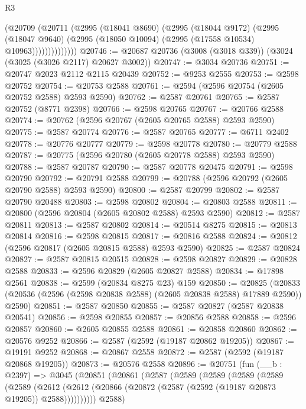 \begin{lexlean}{R3}
\begin{coremodule}
                  (@20709
                    (@20711
                      (@2995
                        (@18041 @8690)
                        (@2995
                          (@18044 @9172)
                          (@2995
                            (@18047 @9640)
                            (@2995 (@18050 @10094) (@2995 (@17558 @10534) @10963))))))))))))))
@20746 := @20687 @20736 (@3008 (@3018 @339)) (@3024 (@3025 (@3026 @2117) @20627 @3002))
@20747 := @3034 @20736
@20751 := @20747 @2023 @2112 @2115 @20439
@20752 := @9253 @2555
@20753 := @2598 @20752
@20754 := @20753 @2588
@20761 := @2594 (@2596 @20754 (@2605 @20752 @2588) @2593 @2590)
@20762 := @2587 @20761
@20765 := @2587 @20752 (@8771 @2398)
@20766 := @2598 @20765
@20767 := @20766 @2588
@20774 := @20762 (@2596 @20767 (@2605 @20765 @2588) @2593 @2590)
@20775 := @2587 @20774
@20776 := @2587 @20765
@20777 := @6711 @2402
@20778 := @20776 @20777
@20779 := @2598 @20778
@20780 := @20779 @2588
@20787 := @20775 (@2596 @20780 (@2605 @20778 @2588) @2593 @2590)
@20788 := @2587 @20787
@20790 := @2587 @20778 @20475
@20791 := @2598 @20790
@20792 := @20791 @2588
@20799 := @20788 (@2596 @20792 (@2605 @20790 @2588) @2593 @2590)
@20800 := @2587 @20799
@20802 := @2587 @20790 @20488
@20803 := @2598 @20802
@20804 := @20803 @2588
@20811 := @20800 (@2596 @20804 (@2605 @20802 @2588) @2593 @2590)
@20812 := @2587 @20811
@20813 := @2587 @20802
@20814 := @20514 @8275
@20815 := @20813 @20814
@20816 := @2598 @20815
@20817 := @20816 @2588
@20824 := @20812 (@2596 @20817 (@2605 @20815 @2588) @2593 @2590)
@20825 := @2587 @20824
@20827 := @2587 @20815 @20515
@20828 := @2598 @20827
@20829 := @20828 @2588
@20833 := @2596 @20829 (@2605 @20827 @2588)
@20834 := @17898 @2561
@20838 := @2599 (@20834 @8275 @23) @159
@20850 := @20825
    (@20833 (@20536 (@2596 (@2598 @20838 @2588) (@2605 @20838 @2588) @17889 @2590)) @2590)
@20851 := @2587 @20850
@20855 := @2587 @20827 (@2587 @20838 @20541)
@20856 := @2598 @20855
@20857 := @20856 @2588
@20858 := @2596 @20857
@20860 := @2605 @20855 @2588
@20861 := @20858 @20860
@20862 := @20576 @9252
@20866 := @2587 (@2592 (@19187 @20862 @19205))
@20867 := @19191 @9252
@20868 := @20867 @2558
@20872 := @2587 (@2592 (@19187 @20868 @19205))
@20873 := @20576 @2558
@20896 := @20751
    (fun (__b : @2397) =>
    @3045
      (@20851
        (@20861
          (@2587
            (@2589
              (@2589
                (@2589
                  (@2589
                    (@2589
                      (@2612
                        (@2612 (@20866 (@20872 (@2587 (@2592 (@19187 @20873 @19205)) @2588))))))))))
            @2588)

\end{coremodule}
\end{lexlean}
